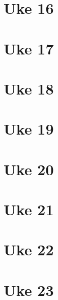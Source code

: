 \documentclass{article}
\begin{document}
  \section{Uke 16}
  \section{Uke 17}
  \section{Uke 18}
  \section{Uke 19}
  \section{Uke 20}
  \section{Uke 21}
  \section{Uke 22}
  \section{Uke 23}
\end{document}
